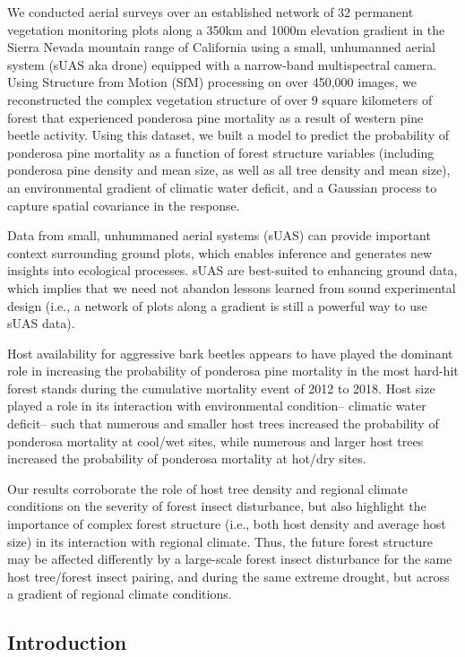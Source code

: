 \documentclass[]{article}
\begin{document}
We conducted aerial surveys over an established network of 32 permanent
vegetation monitoring plots along a 350km and 1000m elevation gradient
in the Sierra Nevada mountain range of California using a small,
unhumanned aerial system (sUAS aka drone) equipped with a narrow-band
multispectral camera. Using Structure from Motion (SfM) processing on
over 450,000 images, we reconstructed the complex vegetation structure
of over 9 square kilometers of forest that experienced ponderosa pine
mortality as a result of western pine beetle activity. Using this
dataset, we built a model to predict the probability of ponderosa pine
mortality as a function of forest structure variables (including
ponderosa pine density and mean size, as well as all tree density and
mean size), an environmental gradient of climatic water deficit, and a
Gaussian process to capture spatial covariance in the response.

Data from small, unhummaned aerial systems (sUAS) can provide important
context surrounding ground plots, which enables inference and generates
new insights into ecological processes. sUAS are best-suited to
enhancing ground data, which implies that we need not abandon lessons
learned from sound experimental design (i.e., a network of plots along a
gradient is still a powerful way to use sUAS data).

Host availability for aggressive bark beetles appears to have played the
dominant role in increasing the probability of ponderosa pine mortality
in the most hard-hit forest stands during the cumulative mortality event
of 2012 to 2018. Host size played a role in its interaction with
environmental condition-- climatic water deficit-- such that numerous
and smaller host trees increased the probability of ponderosa mortality
at cool/wet sites, while numerous and larger host trees increased the
probability of ponderosa mortality at hot/dry sites.

Our results corroborate the role of host tree density and regional
climate conditions on the severity of forest insect disturbance, but
also highlight the importance of complex forest structure (i.e., both
host density and average host size) in its interaction with regional
climate. Thus, the future forest structure may be affected differently
by a large-scale forest insect disturbance for the same host tree/forest
insect pairing, and during the same extreme drought, but across a
gradient of regional climate conditions.

\subsection{Introduction}\label{introduction}
\end{document}
